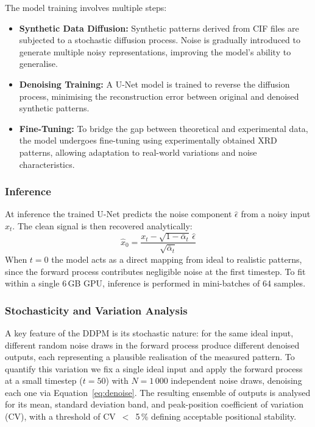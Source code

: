 The model training involves multiple steps:

\begin{itemize}
    \item \textbf{Synthetic Data Diffusion:} Synthetic patterns derived from CIF files are subjected to a stochastic diffusion process.
    Noise is gradually introduced to generate multiple noisy representations, improving the model's ability to generalise.
    \item \textbf{Denoising Training:} A U-Net model is trained to reverse the diffusion process,
    minimising the reconstruction error between original and denoised synthetic patterns.
    \item \textbf{Fine-Tuning:} To bridge the gap between theoretical and experimental data,
    the model undergoes fine-tuning using experimentally obtained XRD patterns,
    allowing adaptation to real-world variations and noise characteristics.
\end{itemize}

\subsubsection{Inference}

At inference the trained U-Net predicts the noise component $\hat{\epsilon}$ from a noisy input $x_t$.
The clean signal is then recovered analytically:
\begin{equation}
\hat{x}_0 = \frac{x_t - \sqrt{1-\bar{\alpha}_t}\,\hat{\epsilon}}{\sqrt{\bar{\alpha}_t}}
\label{eq:denoise}
\end{equation}
When $t=0$ the model acts as a direct mapping from ideal to realistic patterns, since the forward process contributes negligible noise at the first timestep.
To fit within a single 6\,GB GPU, inference is performed in mini-batches of 64 samples.

\subsubsection{Stochasticity and Variation Analysis}

A key feature of the DDPM is its stochastic nature: for the same ideal input, different random noise draws in the forward process produce different denoised outputs, each representing a plausible realisation of the measured pattern.
To quantify this variation we fix a single ideal input and apply the forward process at a small timestep ($t=50$) with $N=1\,000$ independent noise draws, denoising each one via Equation~\ref{eq:denoise}.
The resulting ensemble of outputs is analysed for its mean, standard deviation band, and peak-position coefficient of variation (CV), with a threshold of CV~$<$~5\,\% defining acceptable positional stability.
